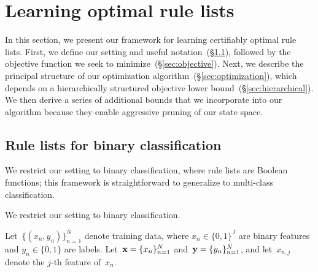\section{Learning optimal rule lists}
\label{sec:framework}

\begin{arxiv}
In this section, we present our framework for learning certifiably optimal rule lists.
%
First, we define our setting and useful notation~(\S\ref{sec:setup}),
followed by the objective function we seek to minimize~(\S\ref{sec:objective}).
%
Next, we describe the principal structure of our optimization algorithm~(\S\ref{sec:optimization}), which depends on a hierarchically
structured objective lower bound~(\S\ref{sec:hierarchical}).
%
We then derive a series of additional bounds that we incorporate into our
algorithm because they enable aggressive pruning of our state space.
\end{arxiv}

\subsection{Rule lists for binary classification}
\label{sec:setup}

\begin{arxiv}
We restrict our setting to binary classification,
where rule lists are Boolean functions;
this framework is straightforward to generalize to multi-class classification.
\end{arxiv}
\begin{kdd}
We restrict our setting to binary classification.
\end{kdd}
%
Let~${\{(x_n, y_n)\}_{n=1}^N}$ denote training data,
where ${x_n \in \{0, 1\}^J}$ are binary features and ${y_n \in \{0, 1\}}$ are labels.
%
Let~${\mathbf{x} = \{x_n\}_{n=1}^N}$ and~${\mathbf{y} = \{y_n\}_{n=1}^N}$,
and let~${x_{n,j}}$ denote the $j$-th feature of~$x_n$.

